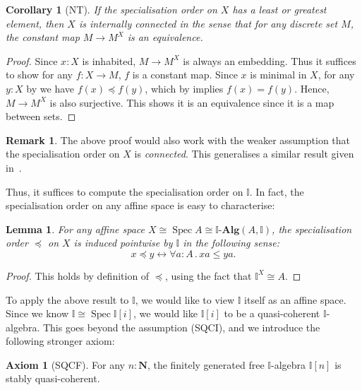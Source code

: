 \documentclass[12pt]{amsart}
\newtheorem{lemma}[theorem]{Lemma}
\newtheorem{corollary}[theorem]{Corollary}
\theoremstyle{definition}
\newtheorem{remark}[theorem]{Remark}
\newtheorem*{axiom}{Axiom}
\newcommand{\mb}[1]{\mathbf{#1}}
\newcommand{\mbb}[1]{\mathbb{#1}}
\newcommand{\I}{\mbb I}
\newcommand{\alg}{\text{-}\mb{Alg}}
\newcommand{\N}{\mb N}
\newcommand{\fa}[2]{\forall #1\!\colon\!\!#2\mathpunct{.}}
\newcommand{\eq}{\leftrightarrow}
\newcommand{\spec}{\operatorname{Spec}}
\begin{document}
\begin{corollary}[NT]\label{cor:connectedpreservediscrete}
  If the specialisation order on $X$ has a least or greatest element, then $X$ is \emph{internally connected} in the sense that for any discrete set $M$, the constant map $M \to M^X$ is an equivalence.
\end{corollary}


\begin{proof}
  Since $x:X$ is inhabited, $M \to M^X$ is always an embedding. Thus it suffices to show for any $f : X \to M$, $f$ is a constant map. Since $x$ is minimal in $X$, for any $y:X$ by  we have $f(x) \preceq f(y)$, which by  implies $f(x) = f(y)$. Hence, $M \to M^X$ is also surjective. This shows it is an equivalence since it is a map between sets.
\end{proof}

\begin{remark}
  The above proof would also work with the weaker assumption that the specialisation order on $X$ is \emph{connected}. This generalises a similar result given in~\cite[Prop.~4.4.1]{hyland1990first}.
\end{remark}

Thus, it suffices to compute the specialisation order on $\I$. In fact, the specialisation order on any affine space is easy to characterise:

\begin{lemma}\label{lem:specorderofaffine}
  For any affine space $X \cong \spec A \cong \I\alg(A,\I)$, the specialisation order $\preceq$ on $X$ is induced pointwise by $\I$ in the following sense:
  \[ x \preceq y \eq \fa aA xa \le ya. \]
\end{lemma}
\begin{proof}
  This holds by definition of $\preceq$, using the fact that $\I^X \cong A$.
\end{proof}

To apply the above result to $\I$, we would like to view $\I$ itself as an affine space. Since we know $\I \cong \spec\I[i]$, we would like $\I[i]$ to be a quasi-coherent $\I$-algebra. This goes beyond the assumption (SQCI), and we introduce the following stronger axiom:

\begin{axiom}[SQCF]
  For any $n : \N$, the finitely generated free $\I$-algebra $\I[n]$ is stably quasi-coherent. 
\end{axiom}
\end{document}
